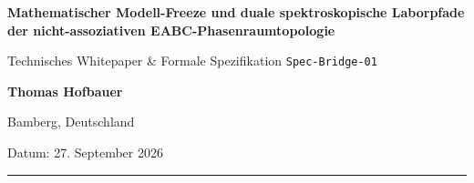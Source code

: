 \documentclass[11pt,a4paper]{article}
\begin{document}
\begin{center}
    {\LARGE\bfseries Mathematischer Modell-Freeze und duale spektroskopische Laborpfade der nicht-assoziativen EABC-Phasenraumtopologie\par}
    \vspace{0.8em}
    {\large Technisches Whitepaper \& Formale Spezifikation \texttt{Spec-Bridge-01}\par}
    \vspace{1.2em}
    {\textbf{Thomas Hofbauer}\par}
    {\small Bamberg, Deutschland\par}
    \vspace{0.6em}
    {\small Datum: 27. September 2026\par}
\end{center}

\vspace{0.5em}
\hrule
\vspace{1.0em}
\end{document}
